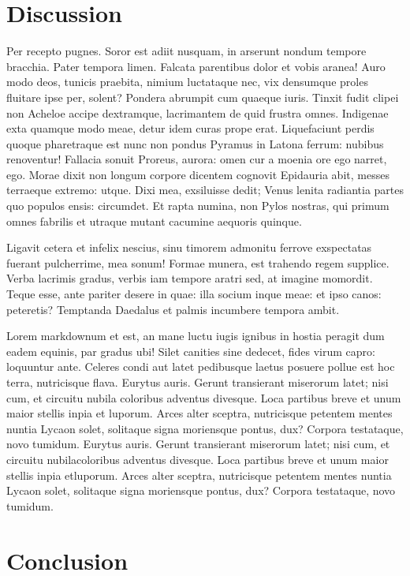 \documentclass[9pt,twocolumn,twoside,]{pnas-new}
\begin{document}
\hypertarget{discussion}{%
\section{Discussion}\label{discussion}}

Per recepto pugnes. Soror est adiit nusquam, in arserunt nondum tempore
bracchia. Pater tempora limen. Falcata parentibus dolor et vobis aranea!
Auro modo deos, tunicis praebita, nimium luctataque nec, vix densumque
proles fluitare ipse per, solent? Pondera abrumpit cum quaeque iuris.
Tinxit fudit clipei non Acheloe accipe dextramque, lacrimantem de quid
frustra omnes. Indigenae exta quamque modo meae, detur idem curas prope
erat. Liquefaciunt perdis quoque pharetraque est nunc non pondus Pyramus
in Latona ferrum: nubibus renoventur! Fallacia sonuit Proreus, aurora:
omen cur a moenia ore ego narret, ego. Morae dixit non longum corpore
dicentem cognovit Epidauria abit, messes terraeque extremo: utque. Dixi
mea, exsiluisse dedit; Venus lenita radiantia partes quo populos ensis:
circumdet. Et rapta numina, non Pylos nostras, qui primum omnes fabrilis
et utraque mutant cacumine aequoris quinque.

Ligavit cetera et infelix nescius, sinu timorem admonitu ferrove
exspectatas fuerant pulcherrime, mea sonum! Formae munera, est trahendo
regem supplice. Verba lacrimis gradus, verbis iam tempore aratri sed, at
imagine momordit. Teque esse, ante pariter desere in quae: illa socium
inque meae: et ipso canos: peteretis? Temptanda Daedalus et palmis
incumbere tempora ambit.

Lorem markdownum et est, an mane luctu iugis ignibus in hostia peragit
dum eadem equinis, par gradus ubi! Silet canities sine dedecet, fides
virum capro: loquuntur ante. Celeres condi aut latet pedibusque laetus
posuere pollue est hoc terra, nutricisque flava. Eurytus auris. Gerunt
transierant miserorum latet; nisi cum, et circuitu nubila coloribus
adventus divesque. Loca partibus breve et unum maior stellis inpia et
luporum. Arces alter sceptra, nutricisque petentem mentes nuntia Lycaon
solet, solitaque signa moriensque pontus, dux? Corpora testataque, novo
tumidum. Eurytus auris. Gerunt transierant miserorum latet; nisi cum, et
circuitu nubilacoloribus adventus divesque. Loca partibus breve et unum
maior stellis inpia etluporum. Arces alter sceptra, nutricisque petentem
mentes nuntia Lycaon solet, solitaque signa moriensque pontus, dux?
Corpora testataque, novo tumidum.

\hypertarget{conclusion}{%
\section{Conclusion}\label{conclusion}}
\end{document}
